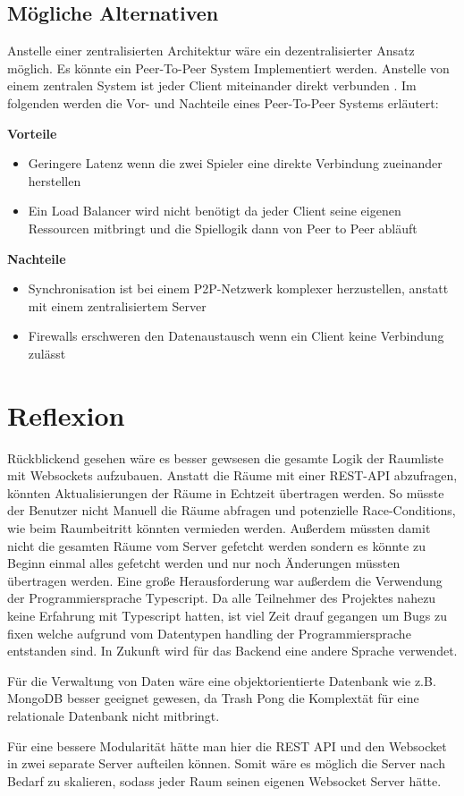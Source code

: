\documentclass[
]{article}
\begin{document}
\subsection{Mögliche Alternativen}
Anstelle einer zentralisierten Architektur wäre ein dezentralisierter Ansatz möglich. Es könnte ein Peer-To-Peer System Implementiert werden. Anstelle von einem zentralen System ist jeder Client miteinander direkt verbunden \cite{gordon2001distributed}. Im folgenden werden die Vor- und Nachteile eines Peer-To-Peer Systems erläutert:

\textbf{Vorteile}
\begin{itemize}
\item Geringere Latenz wenn die zwei Spieler eine direkte Verbindung zueinander herstellen
\item Ein Load Balancer wird nicht benötigt da jeder Client seine eigenen Ressourcen mitbringt und die Spiellogik dann von Peer to Peer abläuft
\end{itemize}

\textbf{Nachteile}
\begin{itemize}
\item Synchronisation ist bei einem P2P-Netzwerk komplexer herzustellen, anstatt mit einem zentralisiertem Server
\item Firewalls \glqq erschweren\grqq{} den Datenaustausch wenn ein Client keine Verbindung zulässt \cite{gordon2001distributed}
\end{itemize}

\section{Reflexion}

Rückblickend gesehen wäre es besser gewsesen die gesamte Logik der Raumliste mit Websockets aufzubauen. Anstatt die Räume mit einer REST-API abzufragen, könnten Aktualisierungen der Räume in Echtzeit übertragen werden. So müsste der Benutzer nicht Manuell die Räume abfragen und potenzielle Race-Conditions, wie beim Raumbeitritt könnten vermieden werden. Außerdem müssten damit nicht die gesamten Räume vom Server gefetcht werden sondern es könnte zu Beginn einmal alles gefetcht werden und nur noch Änderungen müssten übertragen werden.   
Eine große Herausforderung war außerdem die Verwendung der Programmiersprache Typescript. Da alle Teilnehmer des Projektes nahezu keine Erfahrung mit Typescript hatten, ist viel Zeit drauf gegangen um Bugs zu fixen welche aufgrund vom Datentypen handling der Programmiersprache entstanden sind. In Zukunft wird für das Backend eine andere Sprache verwendet.

Für die Verwaltung von Daten wäre eine objektorientierte Datenbank wie z.B. MongoDB besser geeignet gewesen, da 
Trash Pong die Komplextät für eine relationale Datenbank nicht mitbringt. 

Für eine bessere Modularität hätte man hier die REST API und den Websocket in zwei separate Server aufteilen können.
Somit wäre es möglich die Server nach Bedarf zu skalieren, sodass jeder Raum seinen eigenen Websocket Server hätte.

\newpage
 \printbibliography[title={Quellen}]
\end{document}
